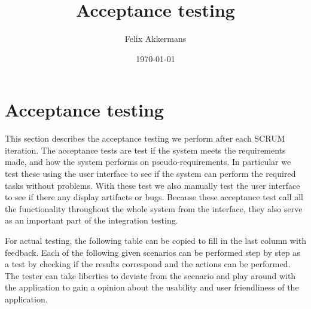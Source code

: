 \documentclass{article}
\newcounter{step}
\begin{document}
\title{Acceptance testing}
\author{Felix Akkermans}
\date{\today}
\maketitle



\section{Acceptance testing}
This section describes the acceptance testing we perform after each SCRUM iteration. The acceptance tests are test if the system meets the requirements made, and how the system performs on pseudo-requirements. In particular we test these using the user interface to see if the system can perform the required tasks without problems. With these test we also manually test the user interface to see if there any display artifacts or bugs. Because these acceptance test call all the functionality throughout the whole system from the interface, they also serve as an important part of the integration testing.

For actual testing, the following table can be copied to fill in the last column with feedback. Each of the following given scenarios can be performed step by step as a test by checking if the results correspond and the actions can be performed. The tester can take liberties to deviate from the scenario and play around with the application to gain a opinion about the usability and user friendliness of the application.
\end{document}
